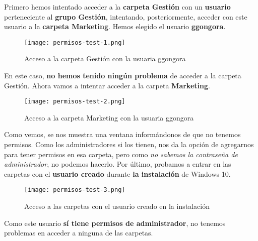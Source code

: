 \begin{enumerate}
   Primero hemos intentado acceder a la \textbf{carpeta Gestión} con un \textbf{usuario} perteneciente al \textbf{grupo Gestión}, intentando, posteriormente, acceder con este usuario a la \textbf{carpeta Marketing}. Hemos elegido el usuario \textbf{ggongora}.

   \begin{figure}[H]
       \centering
       \texttt{[image: permisos-test-1.png]}
       \caption{Acceso a la carpeta Gestión con la usuaria ggongora}
   \end{figure}

    En este caso, \textbf{no hemos tenido ningún problema} de acceder a la carpeta Gestión. Ahora vamos a intentar acceder a la carpeta \textbf{Marketing}.

    \begin{figure}[H]
        \centering
        \texttt{[image: permisos-test-2.png]}
        \caption{Acceso a la carpeta Marketing con la usuaria ggongora}
    \end{figure}

    Como vemos, se nos muestra una ventana informándonos de que no tenemos permisos. Como los administradores si los tienen, nos da la opción de agregarnos para tener permisos en esa carpeta, pero como \textit{no sabemos la contraseña de administrador}, no podemos hacerlo. Por último, probamos a entrar en las carpetas con el \textbf{usuario creado} durante \textbf{la instalación} de Windows 10.

   \begin{figure}[H]
        \centering
        \texttt{[image: permisos-test-3.png]}
        \caption{Acceso a las carpetas con el usuario creado en la instalación}
    \end{figure}

    Como este usuario \textbf{sí tiene permisos de administrador}, no tenemos problemas en acceder a ninguna de las carpetas.
\end{enumerate}




\newpage



